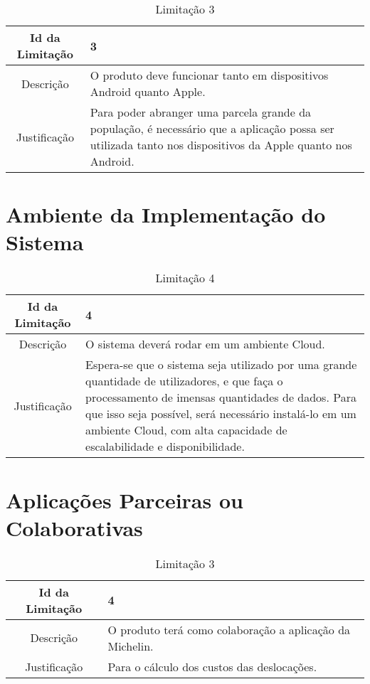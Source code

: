 \begin{table}[!h]
\begin{center}
    \begin{tabularx}{\textwidth}{ | c | X | }
    \hline
    Id da Limitação & 3 \\
    \hline
    Descrição & O produto deve funcionar tanto em dispositivos Android quanto Apple. \\
    \hline
    Justificação & Para poder abranger uma parcela grande da população, é necessário que a aplicação possa ser utilizada tanto nos dispositivos da Apple quanto nos Android. \\
    \hline
    \end{tabularx}
    \caption{Limitação 3} \label{tab:r3}
\end{center}
\end{table}

\section{Ambiente da Implementação do Sistema}\label{0:0.3.2}

\begin{table}[!h]
\begin{center}
    \begin{tabularx}{\textwidth}{ | c | X | }
    \hline
    Id da Limitação & 4 \\
    \hline
    Descrição & O sistema deverá rodar em um ambiente Cloud. \\
    \hline
    Justificação & Espera-se que o sistema seja utilizado por uma grande quantidade de utilizadores, e que faça o processamento de imensas quantidades de dados. Para que isso seja possível, será necessário instalá-lo em um ambiente Cloud, com alta capacidade de escalabilidade e disponibilidade. \\
    \hline
    \end{tabularx}
    \caption{Limitação 4} \label{tab:r4}
\end{center}
\end{table}

\section{Aplicações Parceiras ou Colaborativas}\label{0:0.3.3}

\begin{table}[!h]
\begin{center}
    \begin{tabularx}{\textwidth}{ | c | X | }
    \hline
    Id da Limitação & 4 \\
    \hline
    Descrição & O produto terá como colaboração a aplicação da Michelin. \\
    \hline
    Justificação & Para o cálculo dos custos das deslocações. \\
    \hline
    \end{tabularx}
    \caption{Limitação 3} \label{tab:r3}
\end{center}
\end{table}

